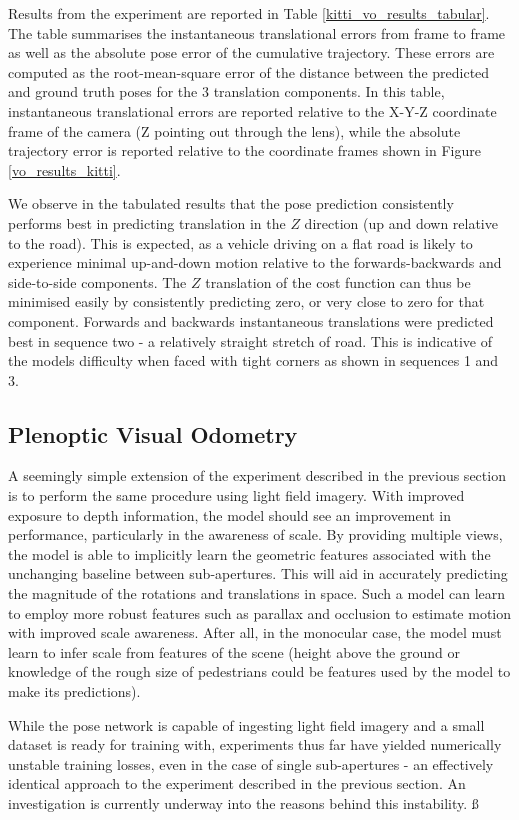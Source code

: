 Results from the experiment are reported in Table \ref{kitti_vo_results_tabular}. The table summarises the instantaneous translational errors from frame to frame as well as the absolute pose error of the cumulative trajectory. These errors are computed as the root-mean-square error of the distance between the predicted and ground truth poses for the 3 translation components. In this table, instantaneous translational errors are reported relative to the X-Y-Z coordinate frame of the camera (Z pointing out through the lens), while the absolute trajectory error is reported relative to the coordinate frames shown in Figure \ref{vo_results_kitti}.







We observe in the tabulated results that the pose prediction consistently performs best in predicting translation in the $Z$ direction (up and down relative to the road). This is expected, as a vehicle driving on a flat road is likely to experience minimal up-and-down motion relative to the forwards-backwards and side-to-side components. The $Z$ translation of the cost function can thus be minimised easily by consistently predicting zero, or very close to zero for that component. Forwards and backwards instantaneous translations were predicted best in sequence two - a relatively straight stretch of road. This is indicative of the models difficulty when faced with tight corners as shown in sequences 1 and 3. 

\subsection{Plenoptic Visual Odometry}
A seemingly simple extension of the experiment described in the previous section is to perform the same procedure using light field imagery. With improved exposure to depth information, the model should see an improvement in performance, particularly in the awareness of scale. By providing multiple views, the model is able to implicitly learn the geometric features associated with the unchanging baseline between sub-apertures. This will aid in accurately predicting the magnitude of the rotations and translations in space. Such a model can learn to employ more robust features such as parallax and occlusion to estimate motion with improved scale awareness. After all, in the monocular case, the model must learn to infer scale from features of the scene (height above the ground or knowledge of the rough size of pedestrians could be features used by the model to make its predictions). 

While the pose network is capable of ingesting light field imagery and a small dataset is ready for training with, experiments thus far have yielded numerically unstable training losses, even in the case of single sub-apertures - an effectively identical approach to the experiment described in the previous section. An investigation is currently underway into the reasons behind this instability. ß